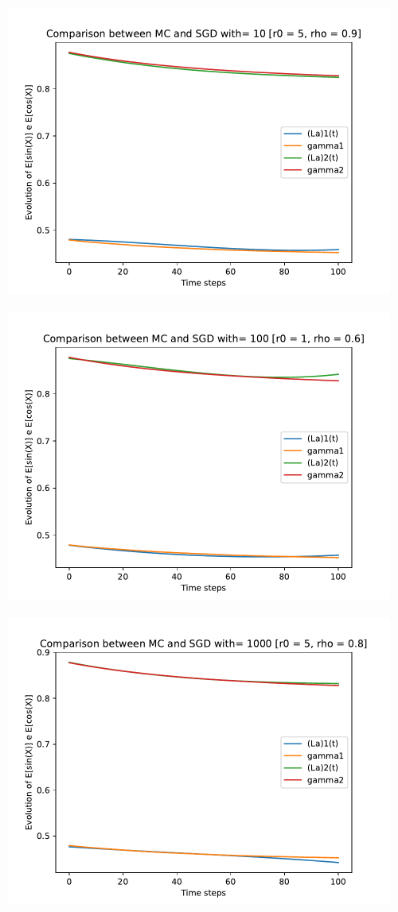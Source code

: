 \documentclass[a4paper,11pt,openright]{report}
\begin{document}
\begin{figure}[H]
\centering
\includegraphics[width=0.9\textwidth]{images/graphics T = 1/n = 3, M = 10 sine and cosine.pdf}
\end{figure}
\begin{figure}[H]
\centering
\includegraphics[width=0.9\textwidth]{images/graphics T = 1/n = 3, M = 100 sine and cosine.pdf}
\end{figure}
\begin{figure}[H]
\centering
\includegraphics[width=0.9\textwidth]{images/graphics T = 1/n = 3, M = 1000 sine and cosine.pdf}
\end{figure}
\end{document}
